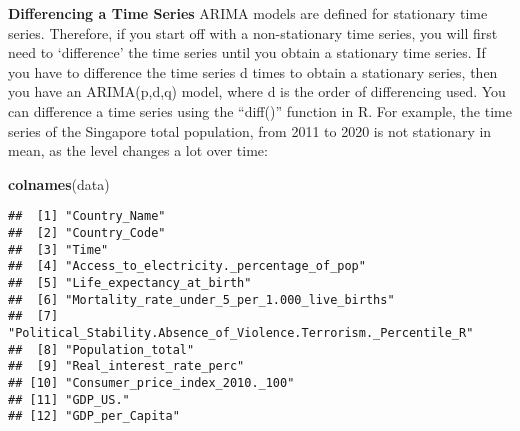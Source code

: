 \documentclass[
]{article}
\newenvironment{Shaded}{\begin{snugshade}}{\end{snugshade}}
\newcommand{\FunctionTok}[1]{\textcolor[rgb]{0.13,0.29,0.53}{\textbf{#1}}}
\newcommand{\NormalTok}[1]{#1}
\newcommand{\OtherTok}[1]{\textcolor[rgb]{0.56,0.35,0.01}{#1}}
\newcommand{\SpecialCharTok}[1]{\textcolor[rgb]{0.81,0.36,0.00}{\textbf{#1}}}
\newcommand{\StringTok}[1]{\textcolor[rgb]{0.31,0.60,0.02}{#1}}
\begin{document}
\textbf{Differencing a Time Series} ARIMA models are defined for
stationary time series. Therefore, if you start off with a
non-stationary time series, you will first need to `difference' the time
series until you obtain a stationary time series. If you have to
difference the time series d times to obtain a stationary series, then
you have an ARIMA(p,d,q) model, where d is the order of differencing
used. You can difference a time series using the ``diff()'' function in
R. For example, the time series of the Singapore total population, from
2011 to 2020 is not stationary in mean, as the level changes a lot over
time:

\begin{Shaded}
\begin{Highlighting}[]
\FunctionTok{colnames}\NormalTok{(data)}
\end{Highlighting}
\end{Shaded}

\begin{verbatim}
##  [1] "Country_Name"                                                   
##  [2] "Country_Code"                                                   
##  [3] "Time"                                                           
##  [4] "Access_to_electricity._percentage_of_pop"                       
##  [5] "Life_expectancy_at_birth"                                       
##  [6] "Mortality_rate_under_5_per_1.000_live_births"                   
##  [7] "Political_Stability.Absence_of_Violence.Terrorism._Percentile_R"
##  [8] "Population_total"                                               
##  [9] "Real_interest_rate_perc"                                        
## [10] "Consumer_price_index_2010._100"                                 
## [11] "GDP_US."                                                        
## [12] "GDP_per_Capita"
\end{verbatim}

\begin{Shaded}
\end{Shaded}
\end{document}
